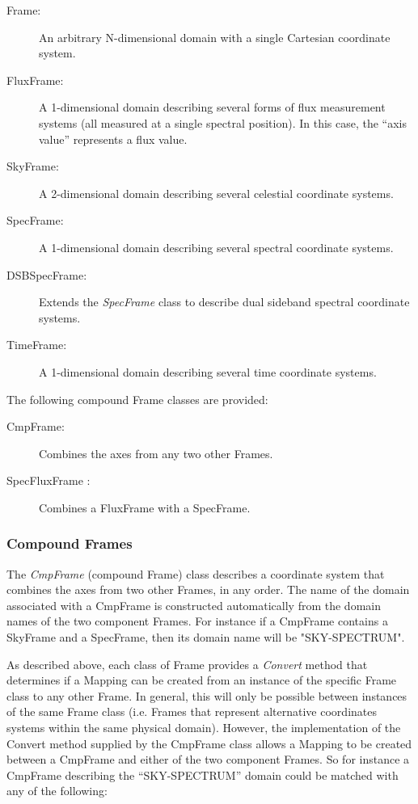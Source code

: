 \documentclass[final,authoryear,5p,times,twocolumn]{elsarticle}
\begin{document}
\begin{description}
\item[Frame:] An arbitrary N-dimensional domain with a single Cartesian
coordinate system.
\item[FluxFrame:] A 1-dimensional domain describing several forms of flux
measurement systems (all measured at a single spectral position). In this
case, the ``axis value'' represents a flux value.
\item[SkyFrame:] A 2-dimensional domain describing several celestial
coordinate systems.
\item[SpecFrame:] A 1-dimensional domain describing several spectral
coordinate systems.
\item[DSBSpecFrame:] Extends the \emph{SpecFrame} class to describe dual
sideband spectral coordinate systems.
\item[TimeFrame:] A 1-dimensional domain describing several time coordinate
systems.
\end{description}

The following compound Frame classes are provided:

\begin{description}
\item[CmpFrame:] Combines the axes from any two other Frames.
\item[SpecFluxFrame :] Combines a FluxFrame with a SpecFrame.
\end{description}

\subsubsection{Compound Frames}
The \emph{CmpFrame} (compound Frame) class describes a coordinate system
that combines the axes from two other Frames, in any order. The name of
the domain associated with a CmpFrame is constructed automatically from
the domain names of the two component Frames. For instance if a CmpFrame
contains a SkyFrame and a SpecFrame, then its domain name will be
"SKY-SPECTRUM".

As described above, each class of Frame provides a \emph{Convert} method
that determines if a Mapping can be created from an instance of the specific
Frame class to any other Frame. In general, this will only be possible
between instances of the same Frame class (i.e. Frames that represent
alternative coordinates systems within the same physical domain).
However, the implementation of the Convert method supplied by the
CmpFrame class allows a Mapping to be created between a CmpFrame and
either of the two component Frames. So for instance a CmpFrame describing
the ``SKY-SPECTRUM'' domain could be matched with any of the following:
\end{document}
